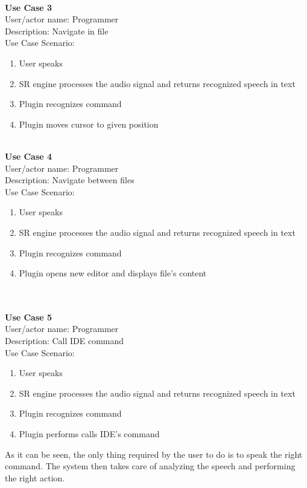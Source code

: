 \leavevmode \\
\noindent
\textbf{Use Case 3}\\
User/actor name: Programmer\\
Description: Navigate in file\\
Use Case Scenario:
\begin{enumerate}
  \item User speaks
  \item SR engine processes the audio signal and returns recognized speech in text 
  \item Plugin recognizes command
  \item Plugin moves cursor to given position
\end{enumerate}

\leavevmode \\
\noindent
\textbf{Use Case 4}\\
User/actor name: Programmer\\
Description: Navigate between files\\
Use Case Scenario:
\begin{enumerate}
  \item User speaks
  \item SR engine processes the audio signal and returns recognized speech in text 
  \item Plugin recognizes command
  \item Plugin opens new editor and displays file's content
\end{enumerate}

\leavevmode \\ \\
\noindent
\textbf{Use Case 5}\\
User/actor name: Programmer\\
Description: Call IDE command\\
Use Case Scenario:
\begin{enumerate}
  \item User speaks
  \item SR engine processes the audio signal and returns recognized speech in text 
  \item Plugin recognizes command
  \item Plugin performs calls IDE's command
\end{enumerate}

\leavevmode

As it can be seen, the only thing required by the user to do is to speak the right command. The system then takes care of analyzing the speech and performing the right action.

